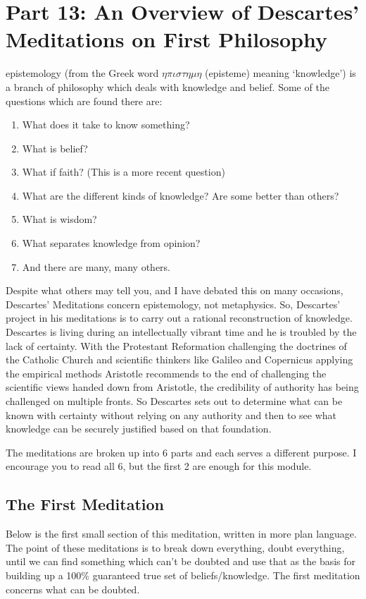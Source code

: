 \chapter{Part 13: An Overview of Descartes' Meditations on First Philosophy}

\Gls{epistemology} (from the Greek word $\eta\pi\iota\sigma\tau\eta\mu\eta$ (epist\-em\-e) meaning ‘knowledge’) is a branch of philosophy which deals with knowledge and belief. Some of the questions which are found there are:
\begin{enumerate}
    \item What does it take to know something?
    \item What is belief?
    \item What if faith? (This is a more recent question)
    \item What are the different kinds of knowledge? Are some better than others?
    \item What is wisdom?
    \item What separates knowledge from opinion?
    \item And there are many, many others.
\end{enumerate}
Despite what others may tell you, and I have debated this on many occasions, Descartes' Meditations concern epistemology, not metaphysics. So, Descartes' project in his meditations is to carry out a rational reconstruction of knowledge. Descartes is living during an intellectually vibrant time and he is troubled by the lack of certainty. With the Protestant Reformation challenging the doctrines of the Catholic Church and scientific thinkers like Galileo and Copernicus applying the empirical methods Aristotle recommends to the end of challenging the scientific views handed down from Aristotle, the credibility of authority has being challenged on multiple fronts. So Descartes sets out to determine what can be known with certainty without relying on any authority and then to see what knowledge can be securely justified based on that foundation.

The meditations are broken up into 6 parts and each serves a different purpose. I encourage you to read all 6, but the first 2 are enough for this module.
\section{The First Meditation}
Below is the first small section of this meditation, written in more plan language. The point of these meditations is to break down everything, doubt everything, until we can find something which can’t be doubted and use that as the basis for building up a 100\% guaranteed true set of beliefs/knowledge. The first meditation concerns what can be doubted.

